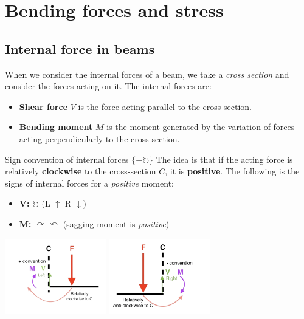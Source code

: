 \section{Bending forces and stress}
\subsection{Internal force in beams}
When we consider the internal forces of a beam, we take a \emph{cross section} and consider the forces acting on it. The internal forces are:
\begin{itemize}
    \item \textbf{Shear force} $V$ is the force acting parallel to the cross-section.
    \item \textbf{Bending moment} $M$ is the moment generated by the variation of forces acting perpendicularly to the cross-section.
\end{itemize}

\begin{definition}
    {Sign convention of internal forces}
    $\{+\circlearrowright\}$ The idea is that if the acting force is relatively \textbf{clockwise} to the cross-section $C$, it is \textbf{positive}.
    The following is the signs of internal forces for a \emph{positive} moment:
    \begin{itemize}
        \item \textbf{V:} $\circlearrowright$ (L $\uparrow$ R $\downarrow$)
        \item \textbf{M:} $\curvearrowright\curvearrowleft$ (sagging moment is \emph{positive})
    \end{itemize}
    \tcblower
    \includegraphics[width=0.33\textwidth]{img/shear2.jpg}
    \includegraphics[width=0.33\textwidth]{img/shear1.jpg}

\end{definition}

